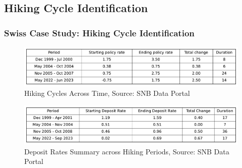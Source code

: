 \documentclass{beamer}
\begin{document}
\subsection{Hiking Cycle Identification}
\begin{frame}
\frametitle{Swiss Case Study: Hiking Cycle Identification}

\begin{center}
\begin{minipage}{1\textwidth}
\begin{figure}[H]
    \includegraphics[width=\textwidth]{../../figures/hiking_summary_SNB.pdf}
    \caption{Hiking Cycles Across Time, Source: SNB Data Portal \cite{snb2023}}
    \label{fig:hiking_summary}
\end{figure}
\end{minipage}
\end{center}

\begin{center}
\begin{minipage}{1\textwidth}
\begin{figure}[H]
    \includegraphics[width=\textwidth]{../../figures/deposit_summary_SNB.pdf}
    \caption{Deposit Rates Summary across Hiking Periods, Source: SNB Data Portal \cite{snb2023}}
    \label{fig:deposit_summary}
\end{figure}
\end{minipage}
\end{center}
\end{frame}
\end{document}
